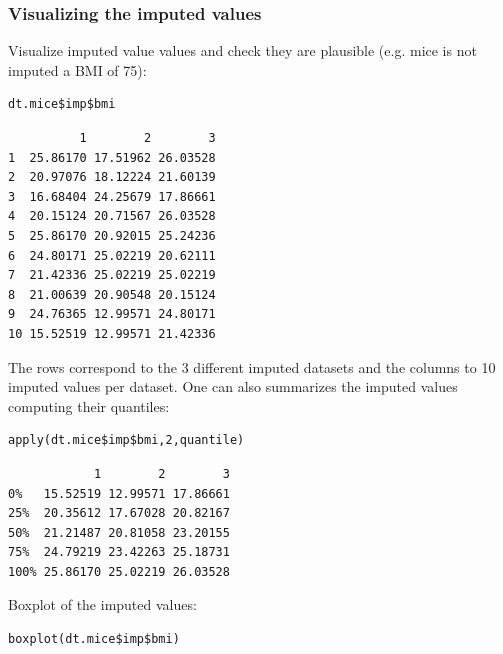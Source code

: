 \documentclass[12pt]{article}
\begin{document}
\subsubsection{Visualizing the imputed values}
\label{sec:orgf5fa909}
Visualize imputed value values and check they are plausible (e.g. mice
is not imputed a BMI of 75):
\lstset{language=r,label= ,caption= ,captionpos=b,numbers=none}
\begin{lstlisting}
dt.mice$imp$bmi
\end{lstlisting}

\begin{verbatim}
          1        2        3
1  25.86170 17.51962 26.03528
2  20.97076 18.12224 21.60139
3  16.68404 24.25679 17.86661
4  20.15124 20.71567 26.03528
5  25.86170 20.92015 25.24236
6  24.80171 25.02219 20.62111
7  21.42336 25.02219 25.02219
8  21.00639 20.90548 20.15124
9  24.76365 12.99571 24.80171
10 15.52519 12.99571 21.42336
\end{verbatim}

The rows correspond to the 3 different imputed datasets and the
columns to 10 imputed values per dataset. One can also summarizes the
imputed values computing their quantiles:

\lstset{language=r,label= ,caption= ,captionpos=b,numbers=none}
\begin{lstlisting}
apply(dt.mice$imp$bmi,2,quantile)
\end{lstlisting}

\begin{verbatim}
            1        2        3
0%   15.52519 12.99571 17.86661
25%  20.35612 17.67028 20.82167
50%  21.21487 20.81058 23.20155
75%  24.79219 23.42263 25.18731
100% 25.86170 25.02219 26.03528
\end{verbatim}


Boxplot of the imputed values:

\lstset{language=r,label= ,caption= ,captionpos=b,numbers=none}
\begin{lstlisting}
boxplot(dt.mice$imp$bmi)
\end{lstlisting}
\end{document}
